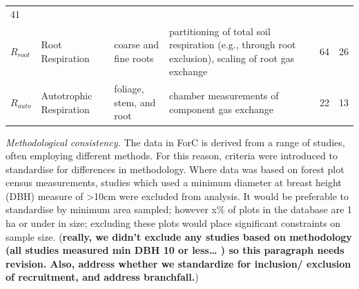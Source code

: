 \documentclass[]{article}
\begin{document}
\begin{longtable}[]{@{}llllll@{}}
\begin{minipage}[t]{0.07\columnwidth}
41\strut
\end{minipage}\tabularnewline
\begin{minipage}[t]{0.14\columnwidth}\raggedright\strut
\(R_{root}\)\strut
\end{minipage} & \begin{minipage}[t]{0.19\columnwidth}\raggedright\strut
Root Respiration\strut
\end{minipage} & \begin{minipage}[t]{0.13\columnwidth}\raggedright\strut
coarse and fine roots\strut
\end{minipage} & \begin{minipage}[t]{0.23\columnwidth}\raggedright\strut
partitioning of total soil respiration (e.g., through root exclusion),
scaling of root gas exchange\strut
\end{minipage} & \begin{minipage}[t]{0.07\columnwidth}\raggedright\strut
64\strut
\end{minipage} & \begin{minipage}[t]{0.07\columnwidth}\raggedright\strut
26\strut
\end{minipage}\tabularnewline
\begin{minipage}[t]{0.14\columnwidth}\raggedright\strut
\(R_{auto}\)\strut
\end{minipage} & \begin{minipage}[t]{0.19\columnwidth}\raggedright\strut
Autotrophic Respiration\strut
\end{minipage} & \begin{minipage}[t]{0.13\columnwidth}\raggedright\strut
foliage, stem, and root\strut
\end{minipage} & \begin{minipage}[t]{0.23\columnwidth}\raggedright\strut
chamber measurements of component gas exchange\strut
\end{minipage} & \begin{minipage}[t]{0.07\columnwidth}\raggedright\strut
22\strut
\end{minipage} & \begin{minipage}[t]{0.07\columnwidth}\raggedright\strut
13\strut
\end{minipage}\tabularnewline
\bottomrule
\end{longtable}

\emph{Methodological consistency.} The data in ForC is derived from a
range of studies, often employing different methods. For this reason,
criteria were introduced to standardise for differences in methodology.
Where data was based on forest plot census measurements, studies which
used a minimum diameter at breast height (DBH) measure of
\textgreater{}10cm were excluded from analysis. It would be preferable
to standardise by minimum area sampled; however x\% of plots in the
database are 1 ha or under in size; excluding these plots would place
significant constraints on sample size. (\textbf{really, we didn't
exclude any studies based on methodology (all studies measured min DBH
10 or less\ldots{} ) so this paragraph needs revision. Also, address
whether we standardize for inclusion/ exclusion of recruitment, and
address branchfall.})
\end{document}
